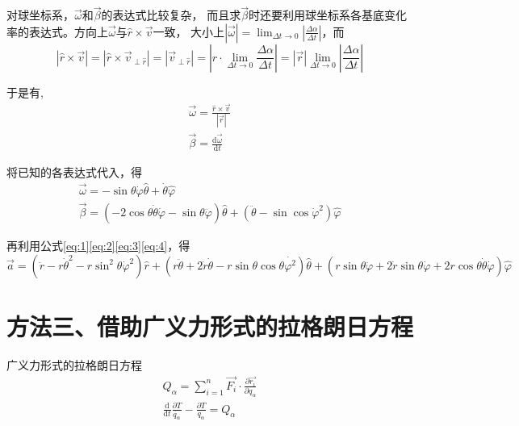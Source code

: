 \documentclass{ctexart}
\begin{document}
    对球坐标系，$\vec{\omega}$和$\vec{\beta}$的表达式比较复杂，
    而且求$\vec{\beta}$时还要利用球坐标系各基底变化率的表达式。方向上$\vec{\omega}$与$\hat{r}\times\vec{v}$一致，
    大小上$|\vec{\omega}| = \lim_{\Delta t \to 0}|\frac{\Delta\alpha}{\Delta t}|$，而
    \begin{equation*}
        |\hat{r}\times\vec{v}| = |\hat{r}\times\vec{v}_{\perp\hat{r}}| =
        |\vec{v}_{\perp\hat{r}}| =
        |r\cdot\lim_{\Delta t \to 0}\frac{\Delta\alpha}{\Delta t}| =
        |\vec{r}|\lim_{\Delta t \to 0}|\frac{\Delta\alpha}{\Delta t}|
    \end{equation*}

    于是有,
    \begin{gather*}
        \vec{\omega} = \frac{\hat{r}\times\vec{v}}{|\vec{r}|} \\
        \vec{\beta} = \frac{\mathrm{d}\vec{\omega}}{\mathrm{d}t}
    \end{gather*}

    将已知的各表达式代入，得
    \begin{gather*}
        \vec{\omega} = -\sin\theta\dot{\varphi}\hat{\theta}+\dot{\theta}\hat{\varphi} \\
        \vec{\beta} = (-2\cos\theta\dot{\theta}\dot{\varphi}-\sin\theta\ddot{\varphi})\hat{\theta}+
        (\ddot{\theta}-\sin\cos\dot{\varphi}^2)\hat{\varphi}
    \end{gather*}

    再利用公式\eqref{eq:1}\eqref{eq:2}\eqref{eq:3}\eqref{eq:4}，得
    \begin{equation*}
        \vec{a} = (\ddot{r}-r\dot{\theta}^2-r\sin^2\theta\dot{\varphi}^2)\hat{r}+
        (r\ddot{\theta}+2\dot{r}\dot{\theta}-r\sin\theta\cos\theta\dot{\varphi^2})\hat{\theta}+
        (r\sin\theta\ddot{\varphi}+2\dot{r}\sin\theta\dot{\varphi}+
        2r\cos\theta\dot{\theta}\dot{\varphi})\hat{\varphi}
    \end{equation*}

    \section[方法三、借助广义力形式的拉格朗日方程]{方法三、借助广义力形式的拉格朗日方程\protect\footnotemark}\label{sec:4}

    广义力形式的拉格朗日方程
    \begin{gather*}
        Q_{\alpha} = \sum_{i = 1}^{n} \vec{F_i}\cdot\frac{\partial\vec{r_i}}{\partial q_{\alpha}} \\
        \frac{\mathrm{d}}{\mathrm{d}t}\frac{\partial T}{\dot{q_{\alpha}}} -
        \frac{\partial T}{q_{\alpha}} = Q_{\alpha}
    \end{gather*}
\end{document}
